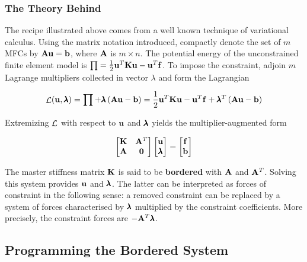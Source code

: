\subsubsection{The Theory Behind}

The recipe illustrated above comes from a well known technique of variational
calculus. Using the matrix notation introduced, compactly denote the set of
$ m $ MFCs by $ \mathbf{A} \mathbf{u} = \mathbf{b} $, where $ \mathbf{A} $ is
$ m \times n $. The potential energy of the unconstrained finite element model is
$ \prod = \frac{1}{2} \mathbf{u}^T \mathbf{K} \mathbf{u} - \mathbf{u}^T \mathbf{f} $.
To impose the constraint, adjoin $ m $ Lagrange multipliers collected in vector
$ \lambda $ and form the Lagrangian

\begin{equation}
    \mathop{\mathcal{L}}(\mathbf{u}, \pmb{\lambda}) = \prod + \pmb{\lambda}
    \left( \mathbf{A} \mathbf{u} - \mathbf{b}\right)
    = \frac{1}{2} \mathbf{u}^T \mathbf{K} \mathbf{u} - \mathbf{u}^T \mathbf{f} + \pmb{\lambda}^T
    \left( \mathbf{A} \mathbf{u} - \mathbf{b}\right)
\end{equation}

Extremizing $ \mathop{\mathcal{L}} $ with respect to $ \mathbf{u} $ and $ \pmb{\lambda} $ yields
the multiplier-augmented form

\begin{equation}\label{nb-ch3-mfc-multiplier-augmented-form}
    \begin{bmatrix}
        \mathbf{K} & \mathbf{A}^T \\
        \mathbf{A} & \mathbf{0}
    \end{bmatrix}
    \begin{bmatrix}
        \mathbf{u} \\
        \pmb{\lambda}
    \end{bmatrix}
    = \begin{bmatrix}
        \mathbf{f} \\
        \mathbf{b}
    \end{bmatrix}
\end{equation}

The master stiffness matrix $ \mathbf{K} $ is said to be \textbf{bordered} with
$ \mathbf{A} $ and $ \mathbf{A}^T $. Solving this system provides $ \mathbf{u} $ and $ \pmb{\lambda} $.
The latter can be interpreted as forces of constraint in the following sense:
a removed constraint can be replaced by a system of forces characterised by
$ \pmb{\lambda} $ multiplied by the constraint coefficients. More precisely,
the constraint forces are $ -\mathbf{A}^T \pmb{\lambda} $.



\subsection{Programming the Bordered System}

